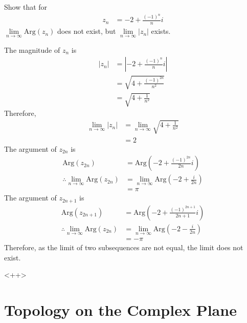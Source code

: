 \documentclass[fleqn, a4paper, 12pt, twoside]{article}
\theoremstyle{definition}
\theoremstyle{theorem}
\newcommand{\Arg}{\mathrm{Arg}}
\begin{document}
\begin{question}
	Show that for
	\begin{align*}
		z_n & = -2 + \frac{(-1)^n}{n} i
	\end{align*}
	$\lim\limits_{n \to \infty} \Arg(z_n)$ does not exist, but $\lim\limits_{n \to \infty} |z_n|$ exists.
\end{question}

\begin{solution}
	The magnitude of $z_n$ is
	\begin{align*}
		|z_n| & = \left| -2 + \frac{(-1)^n}{n} i \right| \\
                      & = \sqrt{4 + \frac{(-1)^{2 n}}{n^2}}      \\
                      & = \sqrt{4 + \frac{1}{n^2}}
	\end{align*}
	Therefore,
	\begin{align*}
		\lim\limits_{n \to \infty} |z_n| & = \lim\limits_{n \to \infty} \sqrt{4 + \frac{1}{n^2}} \\
                                                 & = 2
	\end{align*}
	The argument of $z_{2 n}$ is
	\begin{align*}
		\Arg(z_{2 n})                                       & = \Arg\left( -2 + \frac{(-1)^{2 n}}{2 n} i \right)                 \\
		\therefore \lim\limits_{n \to \infty} \Arg(z_{2 n}) & = \lim\limits_{n \to \infty} \Arg\left( -2 + \frac{i}{2 n} \right) \\
                                                                    & = \pi
	\end{align*}
	The argument of $z_{2 n + 1}$ is
	\begin{align*}
		\Arg(z_{2 n + 1})                                   & = \Arg\left( -2 + \frac{(-1)^{2 n + 1}}{2 n + 1} i \right)         \\
		\therefore \lim\limits_{n \to \infty} \Arg(z_{2 n}) & = \lim\limits_{n \to \infty} \Arg\left( -2 - \frac{i}{2 n} \right) \\
                                                                    & = -\pi
	\end{align*}
	Therefore, as the limit of two subsequences are not equal, the limit does not exist.
\end{solution}<++>

\newpage
\part{Topology on the Complex Plane}
\end{document}
